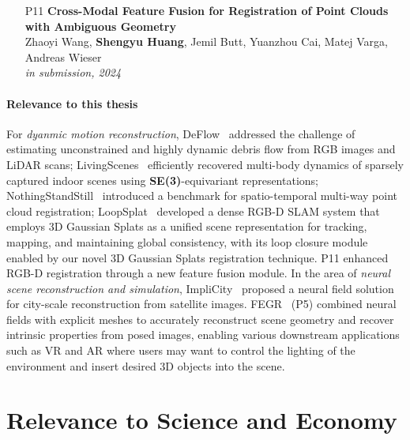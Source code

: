 \begin{itemize}
    \item [P11] \noindent\textbf{ Cross-Modal Feature Fusion for Registration of Point Clouds with Ambiguous Geometry} \\[0.5em]
    Zhaoyi Wang, \textbf{Shengyu Huang}, Jemil Butt, Yuanzhou Cai, Matej Varga, Andreas Wieser \\
    \textit{in submission, 2024}

\end{itemize}

\paragraph{Relevance to this thesis} For \textit{dyanmic motion reconstruction}, DeFlow~\cite{Zhu_2023_CVPR} addressed the challenge of estimating unconstrained and highly dynamic debris flow from RGB images and LiDAR scans; LivingScenes~\cite{zhu2023living} efficiently recovered multi-body dynamics of sparsely captured indoor scenes using \textbf{SE(3)}-equivariant representations; NothingStandStill~\cite{sun2023nothing} introduced a benchmark for spatio-temporal multi-way point cloud registration; LoopSplat~\cite{zhu2024_loopsplat} developed a dense RGB-D SLAM system that employs 3D Gaussian Splats as a unified scene representation for tracking, mapping, and maintaining global consistency, with its loop closure module enabled by our novel 3D Gaussian Splats registration technique. P11 enhanced RGB-D registration through a new feature fusion module. In the area of \textit{neural scene reconstruction and simulation}, ImpliCity~\cite{stucker2022implicity} proposed a neural field solution for city-scale reconstruction from satellite images. FEGR~\cite{wang2023fegr} (P5) combined neural fields with explicit meshes to accurately reconstruct scene geometry and recover intrinsic properties from posed images, enabling various downstream applications such as VR and AR where users may want to control the lighting of the environment and insert desired 3D objects into the scene.


\section{Relevance to Science and Economy}
